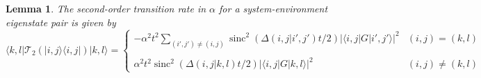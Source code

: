 \documentclass[
 amsmath,amssymb,
 aps,
onecolumn, 
nofootinbib]{revtex4-2}
\newtheorem{lemma}[theorem]{Lemma}
\newcommand{\ket}[1]{|#1\rangle}
\newcommand{\bra}[1]{\langle #1|}
\newcommand{\ketbra}[2]{| #1\rangle\! \langle #2|}
\newcommand{\abs}[1]{\left| #1 \right|}
\DeclareMathOperator{\sinc}{sinc}
\begin{document}
\begin{lemma} \label{lem:second_order_rates_final}
    The second-order transition rate in $\alpha$ for a system-environment eigenstate pair is given by
    \begin{equation}
         \bra{k,l} \mathcal{T}_2 (\ketbra{i,j}{i,j} ) \ket{k,l} 
        = \begin{cases}
             - \alpha^2 t^2 \sum_{(i',j') \neq (i,j)} \sinc^2 \left( \Delta(i,j| i', j') t / 2\right) \abs{\bra{i,j} G \ket{i',j'}}^2 & (i,j) = (k,l) \\
             \\
            \alpha^2 t^2  \sinc^2 \left( \Delta(i,j| k,l) t / 2\right) \abs{\bra{i,j} G \ket{k,l}}^2 & (i,j) \neq (k,l)
        \end{cases}
    \end{equation}
\end{lemma}
\end{document}

